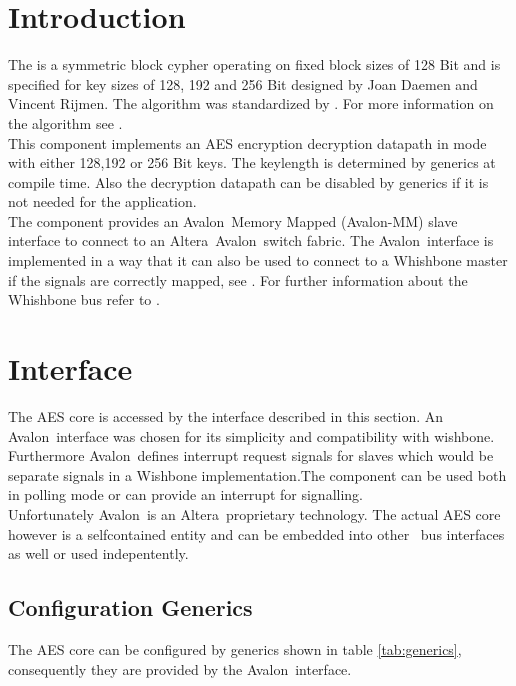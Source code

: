 \documentclass{ruschidoc}
\begin{document}
\maketitle
\newpage
\tableofcontents
\newpage

\section{Introduction}
\label{sec:intro} The \AES is a symmetric block cypher operating on fixed block sizes
of 128 Bit and is specified for key sizes of 128, 192 and 256 Bit designed by Joan
Daemen and Vincent Rijmen. The algorithm was standardized by \NIST. For more
information on the algorithm see \cite{NIST:Fips197}.\\
This component implements an AES encryption decryption datapath in \ECB mode with
either 128,192 or 256 Bit keys.  The keylength is determined by generics at compile
time. Also the decryption datapath can be disabled by generics if it is not needed
for the application.\\
The component provides an Avalon\rtm\ Memory Mapped (Avalon-MM) slave interface to
connect to an Altera\rtm\ Avalon\rtm\ switch fabric. The Avalon\rtm\ interface is
implemented in a way that it can also be used to connect to a Whishbone master if the
signals are correctly mapped, see \cite{Wiki:AvWb}. For further information about the 
Whishbone bus refer to \cite{OC:WBspec}. \\

\section{Interface}
\label{sec:interface}
The AES core is accessed by the interface described in this section. An Avalon\rtm\
interface was chosen for its simplicity and compatibility with wishbone.  Furthermore
Avalon\rtm\ defines interrupt request signals for slaves which would be separate
signals in a Wishbone implementation.The component can be used both in polling 
mode or can provide an interrupt for signalling. \\
Unfortunately Avalon\rtm\ is an Altera\rtm\ proprietary technology. The actual AES
core however is a selfcontained entity and can be embedded into other \SoC\ bus
interfaces as well or used indepentently.

\subsection{Configuration Generics}
\label{sec:generics}
The AES core can be configured by generics shown in table \ref{tab:generics},
consequently they are provided by the Avalon\rtm\ interface.
\end{document}

